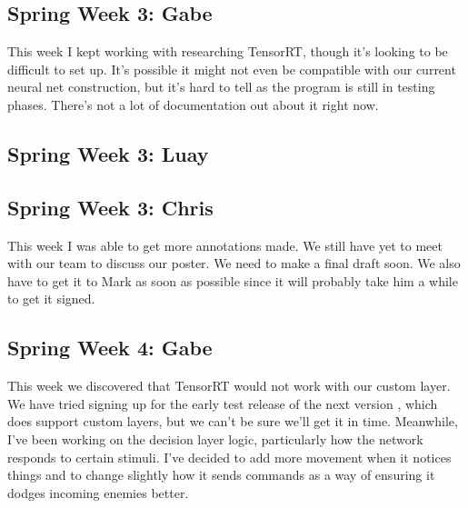 \documentclass[onecolumn, draftclsnofoot,10pt, compsoc]{IEEEtran}
\begin{document}
\subsection{Spring Week 3: Gabe}
This week I kept working with researching TensorRT, though it's looking to be difficult to set up. It's possible it might not even be compatible with our current neural net construction, but it's hard to tell as the program is still in testing phases. There's not a lot of documentation out about it right now.
\subsection{Spring Week 3: Luay}
\subsection{Spring Week 3: Chris}
This week I was able to get more annotations made. We still have yet to meet with our team to discuss our poster. We need to make a final draft soon. We also have to get it to Mark as soon as possible since it will probably take him a while to get it signed.
\subsection{Spring Week 4: Gabe}
This week we discovered that TensorRT would not work with our custom layer. We have tried signing up for the early test release of the next version , which does support custom layers, but we can't be sure we'll get it in time. Meanwhile, I've been working on the decision layer logic, particularly how the network responds to certain stimuli. I've decided to add more movement when it notices things and to change slightly how it sends commands as a way of ensuring it dodges incoming enemies better.
\end{document}
